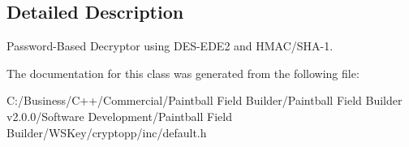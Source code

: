 \subsection{Detailed Description}
Password-\/Based Decryptor using DES-\/EDE2 and HMAC/SHA-\/1. 

The documentation for this class was generated from the following file:\begin{DoxyCompactItemize}
\item 
C:/Business/C++/Commercial/Paintball Field Builder/Paintball Field Builder v2.0.0/Software Development/Paintball Field Builder/WSKey/cryptopp/inc/default.h\end{DoxyCompactItemize}
